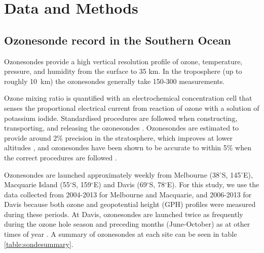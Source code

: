 
\section{Data and Methods}

  \subsection{Ozonesonde record in the Southern Ocean}
  \label{Section:ozonesondes}
    Ozonesondes provide a high vertical resolution profile of ozone, temperature, pressure, and humidity from the surface to 35 km.
    In the troposphere (up to roughly 10~km) the ozonesondes generally take 150-300 measurements.
    
    Ozone mixing ratio is quantified with an electrochemical concentration cell that senses the proportional electrical current from reaction of ozone with a solution of potassium iodide.
    Standardised procedures are followed when constructing, transporting, and releasing the ozonesondes \citep{noaasondes}.
    Ozonesondes are estimated to provide around 2\% precision in the stratosphere, which improves at lower altitudes \citep{noaasondes}, and ozonesondes have been shown to be accurate to within 5\% when the correct procedures are followed \citep{Smit2007}.
    
    Ozonesondes are launched approximately weekly from Melbourne (38$^{\circ}$S, 145$^{\circ}$E), Macquarie Island (55$^{\circ}$S, 159$^{\circ}$E) and Davis (69$^{\circ}$S, 78$^{\circ}$E). 
    For this study, we use the data collected from 2004-2013 for Melbourne and Macquarie, and 2006-2013 for Davis because both ozone and geopotential height (GPH) profiles were measured during these periods.
    At Davis, ozonesondes are launched twice as frequently during the ozone hole season and preceding months (June-October) as at other times of year \citep{Alexander2013}.
    A summary of ozonesondes at each site can be seen in table \ref{table:sondesummary}.
    
